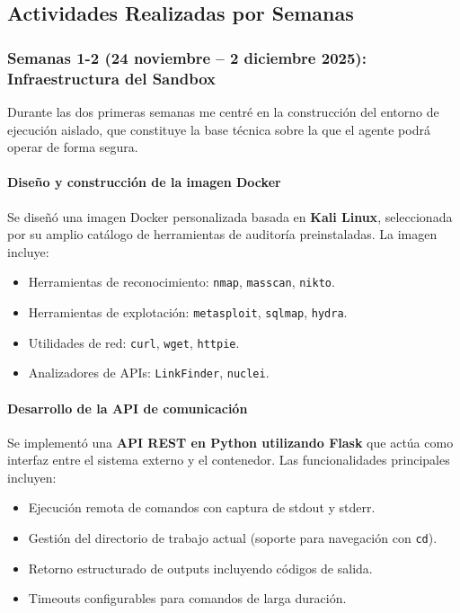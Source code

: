 \documentclass[12pt,a4paper]{article}
\begin{document}
\subsection{Actividades Realizadas por Semanas}

\subsubsection{Semanas 1-2 (24 noviembre -- 2 diciembre 2025): Infraestructura del Sandbox}

Durante las dos primeras semanas me centré en la construcción del entorno de ejecución aislado, que constituye la base técnica sobre la que el agente podrá operar de forma segura.

\paragraph{Diseño y construcción de la imagen Docker}

Se diseñó una imagen Docker personalizada basada en \textbf{Kali Linux}, seleccionada por su amplio catálogo de herramientas de auditoría preinstaladas. La imagen incluye:

\begin{itemize}
    \item Herramientas de reconocimiento: \texttt{nmap}, \texttt{masscan}, \texttt{nikto}.
    \item Herramientas de explotación: \texttt{metasploit}, \texttt{sqlmap}, \texttt{hydra}.
    \item Utilidades de red: \texttt{curl}, \texttt{wget}, \texttt{httpie}.
    \item Analizadores de APIs: \texttt{LinkFinder}, \texttt{nuclei}.
\end{itemize}

\paragraph{Desarrollo de la API de comunicación}

Se implementó una \textbf{API REST en Python utilizando Flask} que actúa como interfaz entre el sistema externo y el contenedor. Las funcionalidades principales incluyen:

\begin{itemize}
    \item Ejecución remota de comandos con captura de stdout y stderr.
    \item Gestión del directorio de trabajo actual (soporte para navegación con \texttt{cd}).
    \item Retorno estructurado de outputs incluyendo códigos de salida.
    \item Timeouts configurables para comandos de larga duración.
\end{itemize}
\end{document}
